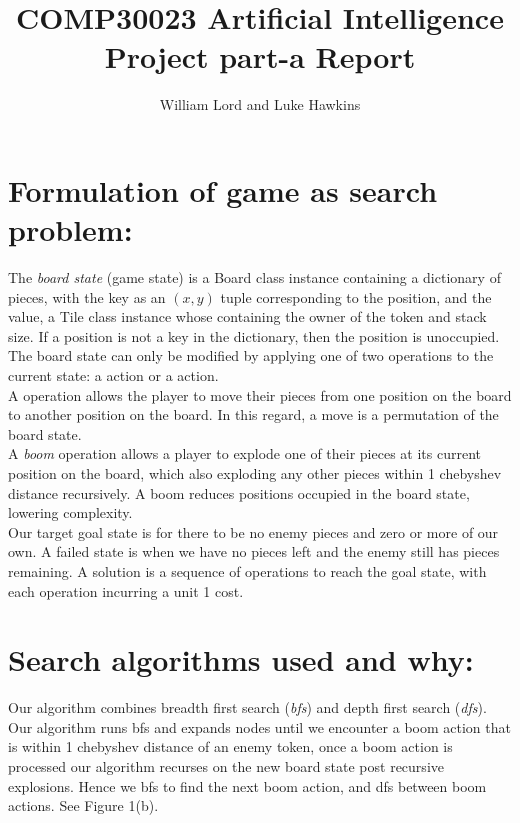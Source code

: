 \documentclass[fleqn]{article}
\title{\vspace{-20mm}COMP30023 Artificial Intelligence Project part-a Report}
\author{William Lord and Luke Hawkins}
\begin{document}
\maketitle
\section{Formulation of game as search problem:}
	 The \textit{board state} (game state) is a Board class instance containing a dictionary of pieces, with the key as an $(x,y)$ tuple corresponding to the position, and the value, a Tile class instance whose containing the owner of the token and stack size. If a position is not a key in the dictionary, then the position is unoccupied. The board state can only be modified by applying one of two operations to the current state:  a  action or a  action.\\

	 \noindent A  operation allows the player to move their pieces from one position on the board to another position on the board. In this regard, a move is a permutation of the board state.\\
	 
	 \noindent A \textit{boom} operation allows a player to explode one of their pieces at its current position on the board, which also exploding any other pieces within 1 chebyshev distance recursively. A boom reduces positions occupied in the board state, lowering complexity.\\
	 
	 \noindent Our target goal state is for there to be no enemy pieces and zero or more of our own. A failed state is when we have no pieces left and the enemy still has pieces remaining. A solution is a sequence of operations to reach the goal state, with each operation incurring a unit 1 cost.

\section{Search algorithms used and why:}
	Our algorithm combines breadth first search (\textit{bfs}) and depth first search (\textit{dfs}). Our algorithm runs bfs and expands nodes until we encounter a boom action that is within 1 chebyshev distance of an enemy token, once a boom action is processed  our algorithm recurses on the new board state post recursive explosions. Hence we bfs to find the next boom action, and dfs between boom actions. See Figure 1(b).\\
\end{document}
